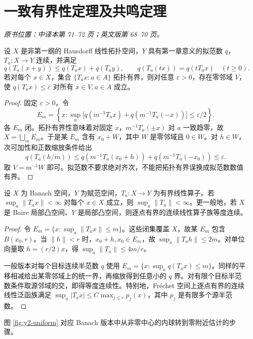 \section{一致有界性定理及共鸣定理}\label{sec:yosida-02-01}
\noindent\textit{原书位置：中译本第 71--72 页；英文版第 68--70 页。}

\begin{theorem}\label{thm:y2-uniform-general}
设 $X$ 是非第一纲的 Hausdorff 线性拓扑空间，$Y$ 具有第一章意义的拟范数 $q$，$T_a:X\to Y$ 连续，并满足
\[
 q(T_a(x+y))\le q(T_ax)+q(T_ay),\qquad
 q(T_a(tx))=q(tT_ax)\quad(t\ge0).
\]
若对每个 $x\in X$，集合 $\{T_ax:a\in A\}$ 拓扑有界，则对任意 $\varepsilon>0$，存在零邻域 $V$，使 $q(T_ax)\le\varepsilon$ 对所有 $x\in V,a\in A$ 成立。
\end{theorem}
\begin{proof}
固定 $\varepsilon>0$，令
\[
 E_m=\left\{x:\sup_a\bigl[q(m^{-1}T_ax)+q(m^{-1}T_a(-x))\bigr]\le\varepsilon/2\right\}.
\]
各 $E_m$ 闭。拓扑有界性意味着对固定 $x$，$m^{-1}T_a(\pm x)$ 对 $a$ 一致趋零，故 $X=\bigcup_mE_m$。于是某 $E_m$ 含有 $x_0+W$，其中 $W$ 是零邻域且 $0\in W$。对 $h\in W$，次可加性和正数缩放条件给出
\[
 q(T_a(h/m))\le q(m^{-1}T_a(x_0+h))+q(m^{-1}T_a(-x_0))\le\varepsilon.
\]
取 $V=m^{-1}W$ 即可。拟范数不要求绝对齐次，不能把拓扑有界误换成拟范数数值有界。
\end{proof}

\begin{theorem}\label{thm:y2-banach-steinhaus}
设 $X$ 为 Banach 空间，$Y$ 为赋范空间，$T_a:X\to Y$ 为有界线性算子。若 $\sup_a\|T_ax\|<\infty$ 对每个 $x\in X$ 成立，则 $\sup_a\|T_a\|<\infty$。更一般地，若 $X$ 是 Baire 局部凸空间、$Y$ 是局部凸空间，则逐点有界的连续线性算子族等度连续。
\end{theorem}
\begin{proof}
令 $E_m=\{x:\sup_a\|T_ax\|\le m\}$。这些闭集覆盖 $X$，故某 $E_m$ 包含 $B(x_0,r)$。当 $\|h\|<r$ 时，$x_0+h,x_0\in E_m$，故 $\sup_a\|T_ah\|\le2m$。对单位向量取 $h=(r/2)x$，得 $\sup_a\|T_a\|\le4m/r$。

一般版本对每个目标连续半范数 $q$ 使用 $E_m=\{x:\sup_aq(T_ax)\le m\}$。同样的平移相减给出某零邻域上的统一界，再缩放得到任意小的 $q$ 界。对有限个目标半范数条件取源邻域的交，即得等度连续性。特别地，Fr\'echet 空间上逐点有界的连续线性泛函族满足 $\sup_a|T_ax|\le C\max_{j\le r}p_j(x)$，其中 $p_j$ 是有限多个源半范数。
\end{proof}

图 \ref{fig:y2-uniform} 对应 Banach 版本中从非零中心的内球转到零附近估计的步骤。



